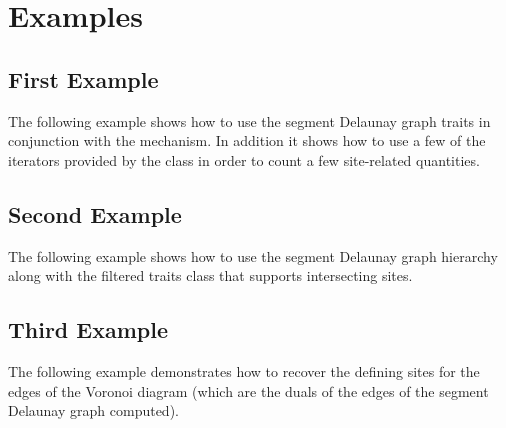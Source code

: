
\section{Examples\label{sec:sdg2-examples}}

\subsection{First Example}

The following example shows how to use the segment Delaunay graph traits
in conjunction with the  mechanism. In
addition it shows how to use a few of the iterators provided by the
 class in order to count a few
site-related quantities.


\subsection{Second Example}

The following example shows how to use the segment Delaunay graph
hierarchy along with the filtered traits class that supports
intersecting sites.


\subsection{Third Example}

The following example demonstrates how to recover the defining sites
for the edges of the Voronoi diagram (which are the duals of the
edges of the segment Delaunay graph computed).


